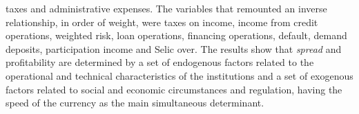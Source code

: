 {taxes and administrative expenses. The variables that remounted an inverse relationship, in order of weight, were taxes on income, income from credit operations, weighted risk, loan operations, financing operations, default, demand deposits, participation income and Selic over. The results show that \emph{spread} and profitability are determined by a set of endogenous factors related to the operational and technical characteristics of the institutions and a set of exogenous factors related to social and economic circumstances and regulation, having the speed of the currency as the main simultaneous determinant.
}
\newcommand{\KeywordsTexto}{%
Banking Sector. Spread. Profitability. Currency Speed.
}







\newcommand{\AgradecimentosTexto}{%

}

\newcommand{\DedicatoriaTexto}{%
\textit{Dedico este trabalho em memória de minha mãe, Maria Cilene Martins da Silva, que será sempre exemplo de vida e caráter}
	}

